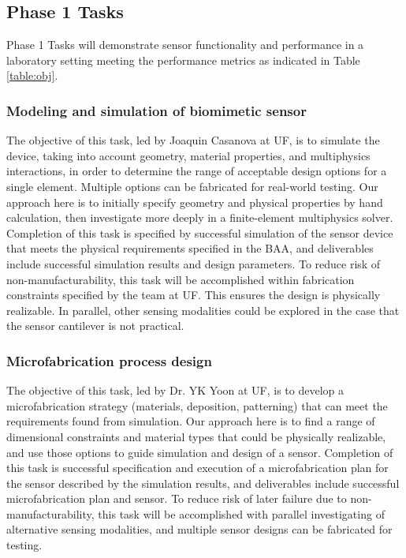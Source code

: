 \subsection{Phase 1 Tasks}

Phase 1 Tasks will demonstrate sensor functionality and performance in a laboratory
setting meeting the performance metrics as indicated in Table \ref{table:obj}. 

\subsubsection{Modeling and simulation of biomimetic sensor}\label{sec:p1:em}

The objective of this task, led by Joaquin Casanova at UF, is to simulate the device, taking into account geometry, material properties, and multiphysics interactions, in order to determine the range of acceptable design options for a single element. Multiple options can be fabricated for real-world testing. Our approach here is to initially specify geometry and physical properties by hand calculation, then investigate more deeply in a finite-element multiphysics solver. Completion of this task is specified by successful simulation of the sensor device that meets the physical requirements specified in the BAA, and deliverables include successful simulation results and design parameters. To reduce risk of non-manufacturability, this task will be accomplished within fabrication constraints specified by the team at UF. This ensures the design is physically realizable. In parallel, other sensing modalities could be explored in the case that the sensor cantilever is not practical.

\subsubsection{Microfabrication process design}\label{sec:p1:mf}

The objective of this task, led by Dr. YK Yoon at UF, is to develop a microfabrication strategy (materials, deposition, patterning) that can meet the requirements found from simulation. Our approach here is to find a range of dimensional constraints and material types that could be physically realizable, and use those options to guide simulation and design of a sensor. Completion of this task is successful specification and execution of a microfabrication plan for the sensor described by the simulation results, and deliverables include successful microfabrication plan and sensor. To reduce risk of later failure due to non-manufacturability, this task will be accomplished with parallel investigating of alternative sensing modalities, and multiple sensor designs can be fabricated for testing.

